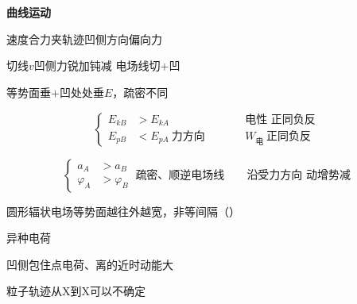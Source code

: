 \textbf{曲线运动}

速度合力夹轨迹\quad 凹侧方向偏向力

切线$v$\quad 凹侧力\quad 锐加钝减
电场线\quad 切$+$凹

等势面\quad 垂$+$凹\quad 处处垂$E$，疏密不同


\[
\left\{\begin{aligned}
E_{kB}&>E_{kA}\\
E_{pB}&<E_{pA}\ \text{力方向}
\end{aligned}\right.
\qquad
\begin{aligned}
&\text{电性\ 正同负反}\\
&W_{\text{电}}\ \text{正同负反}
\end{aligned}
\]

\[
\left\{\begin{aligned}
a_A&>a_B\\
\varphi_A&>\varphi_B
\end{aligned}\right.
\ \text{疏密、顺逆电场线}
\qquad
\text{沿受力方向\ 动增势减}
\]

圆形辐状电场等势面越往外越宽，非等间隔（）

异种电荷

凹侧包住点电荷、离的近时动能大

粒子轨迹从X到X可以不确定
